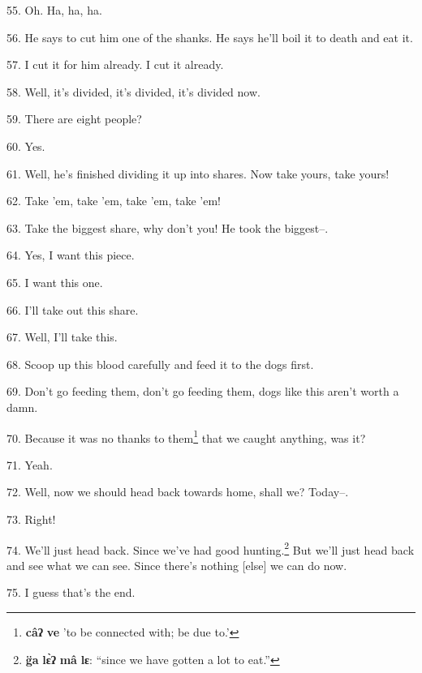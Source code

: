 55. Oh. Ha, ha, ha.

56. He says to cut him one of the shanks. He says he'll boil it to death and eat
it.

57. I cut it for him already. I cut it already.

58. Well, it's divided, it's divided, it's divided now.

59. There are eight people?

60. Yes.

61. Well, he's finished dividing it up into shares. Now take yours, take yours!

62. Take 'em, take 'em, take 'em, take 'em!

63. Take the biggest share, why don't you! He took the biggest--.

64. Yes, I want this piece.

65. I want this one.

66. I'll take out this share.

67. Well, I'll take this.

68. Scoop up this blood carefully and feed it to the dogs first.

69. Don't go feeding them, don't go feeding them, dogs like this aren't worth a
damn.

70. Because it was no thanks to them\footnote{\textbf{câʔ} \textbf{ve} 'to be connected with; be due to.'} that we caught anything, was it?

71. Yeah.

72. Well, now we should head back towards home, shall we? Today--.

73. Right!

74. We'll just head back. Since we've had good hunting.\footnote{\textbf{g̈a} \textbf{lɛ̀ʔ} \textbf{mâ} \textbf{lɛ}: ``since we have gotten a lot to eat.''} But we'll just head
back and see what we can see. Since there's nothing [else] we can do now.

75. I guess that's the end.

